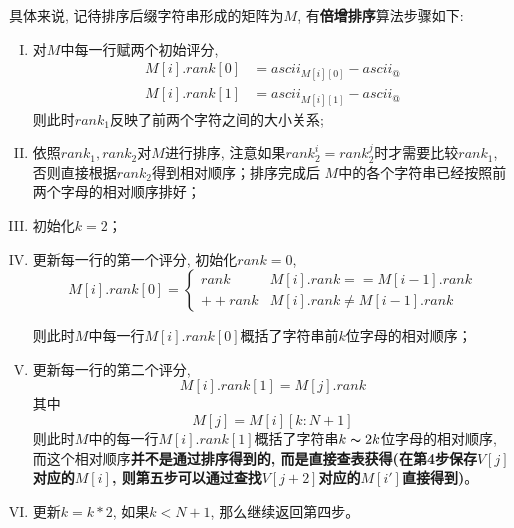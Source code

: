 \documentclass[UTF8]{ctexart}
\begin{document}
    \par\noindent 具体来说, 记待排序后缀字符串形成的矩阵为$M$, 有\textbf{倍增排序}算法步骤如下:
    \begin{enumerate}[I.]
        \item 对$M$中每一行赋两个初始评分, \begin{align}
                    M[i].rank[0]&=ascii_{M[i][0]} - ascii_{@}\\
                    M[i].rank[1]&=ascii_{M[i][1]} - ascii_{@}
            \end{align}
        则此时$rank_1$反映了前两个字符之间的大小关系;
        \item 依照$rank_1,rank_2$对$M$进行排序, 注意如果$rank_2^i = rank_2^j$时才需要比较$rank_1$, 否则直接根据$rank_2$得到相对顺序；排序完成后
        $M$中的各个字符串已经按照前两个字母的相对顺序排好；
        \item 初始化$k=2$；
        \item %
              更新每一行的第一个评分, 初始化$rank=0$,\begin{equation}
                M[i].rank[0] = \begin{cases}
                    rank &M[i].rank == M[i-1].rank\\
                    ++rank &M[i].rank \neq M[i-1].rank
                \end{cases}
              \end{equation}

              则此时$M$中每一行$M[i].rank[0]$概括了字符串前$k$位字母的相对顺序；
        \item 更新每一行的第二个评分, \begin{equation}
            M[i].rank[1] = M[j].rank
        \end{equation}
        其中\begin{equation}
            M[j] = M[i][k:N+1]
        \end{equation}
        则此时$M$中的每一行$M[i].rank[1]$概括了字符串$k\thicksim 2k$位字母的相对顺序, 而这个相对顺序\textbf{并不是通过排序得到的, 而是直接查表获得(在第4步保存$V[j]$对应的$M[i]$, 则第五步可以通过查找$V[j+2]$对应的$M[i']$直接得到)}。
        \item 更新$k = k*2$, 如果$k < N+1$, 那么继续返回第四步。
    \end{enumerate}
\end{document}
